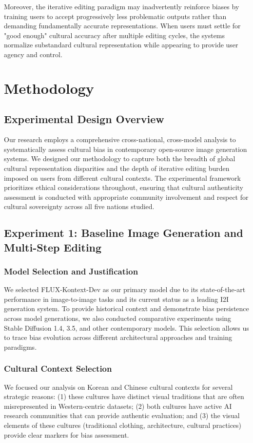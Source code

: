 \documentclass{article}
\begin{document}
Moreover, the iterative editing paradigm may inadvertently reinforce biases by training users to accept progressively less problematic outputs rather than demanding fundamentally accurate representations. When users must settle for "good enough" cultural accuracy after multiple editing cycles, the systems normalize substandard cultural representation while appearing to provide user agency and control.


\section{Methodology}

\subsection{Experimental Design Overview}

Our research employs a comprehensive cross-national, cross-model analysis to systematically assess cultural bias in contemporary open-source image generation systems. We designed our methodology to capture both the breadth of global cultural representation disparities and the depth of iterative editing burden imposed on users from different cultural contexts. The experimental framework prioritizes ethical considerations throughout, ensuring that cultural authenticity assessment is conducted with appropriate community involvement and respect for cultural sovereignty across all five nations studied.

\subsection{Experiment 1: Baseline Image Generation and Multi-Step Editing}

\subsubsection{Model Selection and Justification}
We selected FLUX-Kontext-Dev as our primary model due to its state-of-the-art performance in image-to-image tasks and its current status as a leading I2I generation system. To provide historical context and demonstrate bias persistence across model generations, we also conducted comparative experiments using Stable Diffusion 1.4, 3.5, and other contemporary models. This selection allows us to trace bias evolution across different architectural approaches and training paradigms.

\subsubsection{Cultural Context Selection}
We focused our analysis on Korean and Chinese cultural contexts for several strategic reasons: (1) these cultures have distinct visual traditions that are often misrepresented in Western-centric datasets; (2) both cultures have active AI research communities that can provide authentic evaluation; and (3) the visual elements of these cultures (traditional clothing, architecture, cultural practices) provide clear markers for bias assessment.
\end{document}
